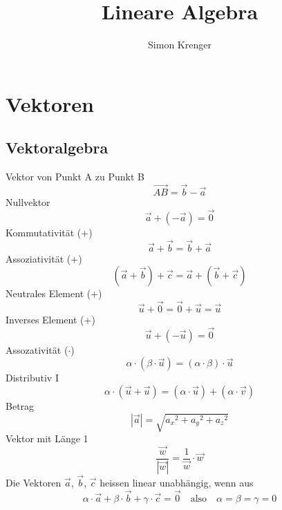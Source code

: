 \documentclass{report}
\title{Lineare Algebra}
\author{Simon Krenger}
\begin{document}
\maketitle
\chapter{Vektoren}
\section{Vektoralgebra}
Vektor von Punkt A zu Punkt B\begin{equation}\vec{AB} = \vec{b} - \vec{a}\end{equation}
Nullvektor\begin{equation}\vec{a} + (- \vec{a}) = \vec{0}\end{equation}
Kommutativität (+)\begin{equation}\vec{a} + \vec{b} = \vec{b} + \vec{a}\end{equation}
Assoziativität (+)\begin{equation}(\vec{a} + \vec{b}) + \vec{c} = \vec{a} + (\vec{b} + \vec{c})\end{equation}
Neutrales Element (+)\begin{equation}\vec{u} + \vec{0} = \vec{0} + \vec{u} = \vec{u}\end{equation}
Inverses Element (+)\begin{equation}\vec{u} + (- \vec{u}) = \vec{0}\end{equation}
Assozativität ($\cdot$)\begin{equation}\alpha \cdot (\beta \cdot \vec{u}) = (\alpha \cdot \beta) \cdot \vec{u}\end{equation}
Distributiv I\begin{equation}\alpha \cdot (\vec{u} + \vec{u})  = (\alpha \cdot \vec{u})+(\alpha \cdot \vec{v})\end{equation}
Betrag\begin{equation}|\vec{a}| = \sqrt{{a_x}^2+{a_y}^2+{a_z}^2}\end{equation}
Vektor mit Länge 1\begin{equation}\frac{\vec{w}}{|\vec{w}|} = \frac{1}{\vec{w}} \cdot \vec{w}\end{equation}
Die Vektoren $\vec{a}$, $\vec{b}$, $\vec{c}$ heissen linear unabhängig, wenn aus 
\begin{equation}\alpha \cdot \vec{a} + \beta \cdot \vec{b} + \gamma \cdot \vec{c} = \vec{0} \quad \mbox{also} \quad \alpha = \beta = \gamma = 0\end{equation}
\end{document}
